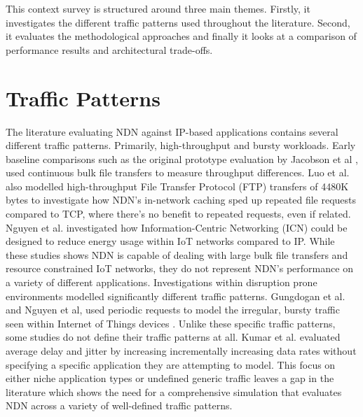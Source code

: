 \documentclass[12pt]{report}
\begin{document}
    This context survey is structured around three main themes. Firstly, it investigates the different traffic patterns used throughout the literature. Second, it evaluates the methodological approaches and finally it looks at a comparison of performance results and architectural trade-offs.

    \section{Traffic Patterns}
    The literature evaluating NDN against IP-based applications contains several different traffic patterns. Primarily, high-throughput and bursty workloads. Early baseline comparisons such as the original prototype evaluation by Jacobson et al \cite{jacobson_networking_2009}, used continuous bulk file transfers to measure throughput differences. Luo et al. also modelled high-throughput File Transfer Protocol (FTP) transfers of 4480K bytes to investigate how NDN's in-network caching sped up repeated file requests compared to TCP, where there's no benefit to repeated requests, even if related. Nguyen et al.\cite{nguyen_cross-layer_2022} investigated how Information-Centric Networking (ICN) could be designed to reduce energy usage within IoT networks compared to IP. While these studies shows NDN is capable of dealing with large bulk file transfers and resource constrained IoT networks, they do not represent NDN's performance on a variety of different applications.
    Investigations within disruption prone environments modelled significantly different traffic patterns. Gungdogan et al. and Nguyen et al, used periodic requests to model the irregular, bursty traffic seen within Internet of Things devices \cite{gundogan_ndn_2018}\cite{nguyen_cross-layer_2022}. Unlike these specific traffic patterns, some studies do not define their traffic patterns at all. Kumar et al. evaluated average delay and jitter by increasing incrementally increasing data rates without specifying a specific application they are attempting to model\cite{kumar_comparing_2022}. This focus on either niche application types or undefined generic traffic leaves a gap in the literature which shows the need for a comprehensive simulation that evaluates NDN across a variety of well-defined traffic patterns.
\end{document}
